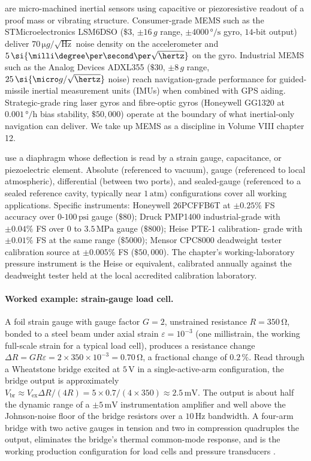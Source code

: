  are micro-machined
inertial sensors using capacitive or piezoresistive readout of a
proof mass or vibrating structure. Consumer-grade MEMS such as
the STMicroelectronics LSM6DSO ($\$3$, $\pm 16\,g$ range,
$\pm 4000\,\si{\degree\per\second}$ gyro, $14$-bit output) deliver
$70\,\si{\micro g/\sqrt{\si{\hertz}}}$ noise density on the
accelerometer and $5\,\si{\milli\degree\per\second\per\sqrt{
\hertz}}$ on the gyro. Industrial MEMS such as the Analog Devices
ADXL355 ($\$30$, $\pm 8\,g$ range, $25\,\si{\micro g/\sqrt{\hertz}}$
noise) reach navigation-grade performance for guided-missile
inertial measurement units (IMUs) when combined with GPS aiding.
Strategic-grade ring laser gyros and fibre-optic gyros (Honeywell
GG1320 at $0.001\,\si{\degree\per\hour}$ bias stability,
$\$50{,}000$) operate at the boundary of what inertial-only
navigation can deliver. We take up MEMS as a discipline in
Volume VIII chapter 12.

 use a diaphragm whose deflection is
read by a strain gauge, capacitance, or piezoelectric element.
Absolute (referenced to vacuum), gauge (referenced to local
atmospheric), differential (between two ports), and sealed-gauge
(referenced to a sealed reference cavity, typically near
$1\,\text{atm}$) configurations cover all working applications.
Specific instruments: Honeywell 26PCFFB6T at $\pm 0.25\%$ FS
accuracy over $0$-$100\,\text{psi}$ gauge ($\$80$); Druck
PMP1400 industrial-grade with $\pm 0.04\%$ FS over $0$ to
$3.5\,\si{\mega\pascal}$ gauge ($\$800$); Heise PTE-1 calibration-
grade with $\pm 0.01\%$ FS at the same range ($\$5000$); Mensor
CPC8000 deadweight tester calibration source at $\pm 0.005\%$ FS
($\$50{,}000$). The chapter's working-laboratory pressure
instrument is the Heise or equivalent, calibrated annually
against the deadweight tester held at the local accredited
calibration laboratory.

\paragraph{Worked example: strain-gauge load cell.} A
foil strain gauge with gauge factor $G = 2$, unstrained resistance
$R = 350 \,\si{\ohm}$, bonded to a steel beam under axial strain
$\varepsilon = 10^{-3}$ (one millistrain, the working full-scale
strain for a typical load cell), produces a resistance change
$\Delta R = G R \varepsilon = 2 \times 350 \times 10^{-3} =
0.70 \,\si{\ohm}$, a fractional change of $0.2\,\%$. Read through a
Wheatstone bridge excited at $5 \,\si{\volt}$ in a single-active-arm
configuration, the bridge output is approximately
$V_{\text{br}} \approx V_{\text{ex}} \Delta R / (4 R) = 5 \times 0.7
/ (4 \times 350) \approx 2.5 \,\si{\milli\volt}$. The output is
about half the dynamic range of a $\pm 5 \,\si{\milli\volt}$
instrumentation amplifier and well above the Johnson-noise floor of
the bridge resistors over a $10 \,\si{\hertz}$ bandwidth. A four-arm
bridge with two active gauges in tension and two in compression
quadruples the output, eliminates the bridge's thermal common-mode
response, and is the working production configuration for load cells
and pressure transducers \cite{text:ch05-pallas-areny-webster2001}.

